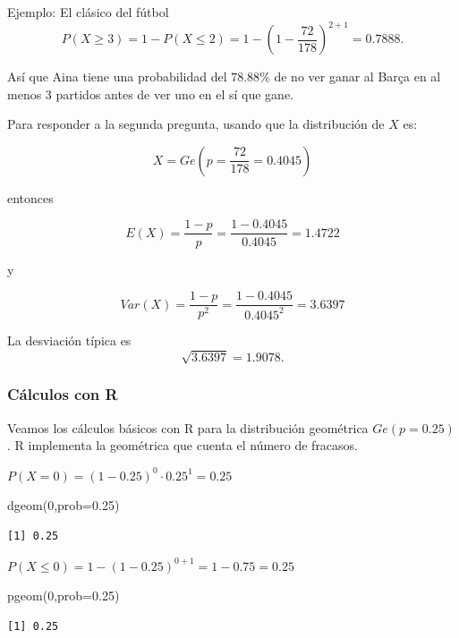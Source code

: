 \documentclass[
  letterpaper,
  DIV=11,
  numbers=noendperiod]{scrreprt}
\newenvironment{Shaded}{\begin{snugshade}}{\end{snugshade}}
\newcommand{\AttributeTok}[1]{\textcolor[rgb]{0.40,0.45,0.13}{#1}}
\newcommand{\DecValTok}[1]{\textcolor[rgb]{0.68,0.00,0.00}{#1}}
\newcommand{\FloatTok}[1]{\textcolor[rgb]{0.68,0.00,0.00}{#1}}
\newcommand{\FunctionTok}[1]{\textcolor[rgb]{0.28,0.35,0.67}{#1}}
\newcommand{\NormalTok}[1]{\textcolor[rgb]{0.00,0.23,0.31}{#1}}
\begin{document}
\begin{Ejemplo}{Ejemplo: El clásico del fútbol}{}
\[P(X\geq 3)=1-P(X\leq 2)=1-\left(1-\frac{72}{178}\right)^{2+1}=0.7888.\]

Así que Aina tiene una probabilidad del \(78.88\%\) de no ver ganar al
Barça en al menos 3 partidos antes de ver uno en el sí que gane.

Para responder a la segunda pregunta, usando que la distribución de
\(X\) es:

\[X=Ge\left(p=\frac{72}{178}=0.4045\right)\]

entonces

\[E(X)=\frac{1-p}{p}=\frac{1-0.4045}{0.4045}=1.4722\]

y

\[Var(X)=\frac{1-p}{p^2}=\frac{1-0.4045}{0.4045^2}=3.6397\]

La desviación típica es \[\sqrt{3.6397}=1.9078.\]

\end{Ejemplo}

\subsubsection{Cálculos con R}\label{cuxe1lculos-con-r}

Veamos los cálculos básicos con R para la distribución geométrica
\(Ge(p=0.25)\). R implementa la geométrica que cuenta el número de
fracasos.

\(P(X=0)=(1-0.25)^0\cdot 0.25^1=0.25\)

\begin{Shaded}
\begin{Highlighting}[]
\FunctionTok{dgeom}\NormalTok{(}\DecValTok{0}\NormalTok{,}\AttributeTok{prob=}\FloatTok{0.25}\NormalTok{)}
\end{Highlighting}
\end{Shaded}

\begin{verbatim}
[1] 0.25
\end{verbatim}

\(P(X\leq 0)=1- (1-0.25)^{0+1}=1-0.75=0.25\)

\begin{Shaded}
\begin{Highlighting}[]
\FunctionTok{pgeom}\NormalTok{(}\DecValTok{0}\NormalTok{,}\AttributeTok{prob=}\FloatTok{0.25}\NormalTok{)}
\end{Highlighting}
\end{Shaded}

\begin{verbatim}
[1] 0.25
\end{verbatim}
\end{document}
